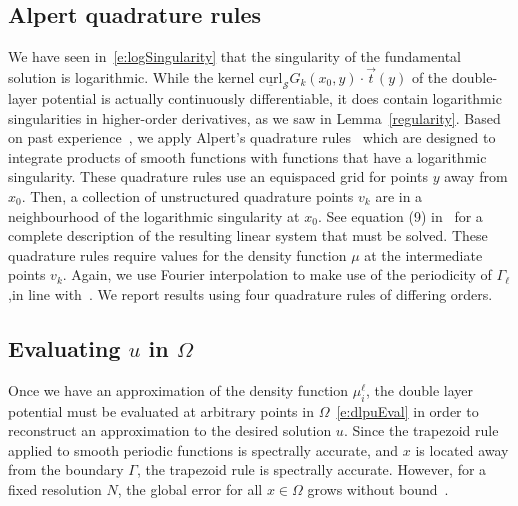 \documentclass[final]{siamltex}
\renewcommand{\S} {\mathcal{S}}
\begin{document}
\subsection{Alpert quadrature rules}
We have seen in~\eqref{e:logSingularity} that the singularity of the
fundamental solution is logarithmic.  While the kernel
$\underline{\mbox{curl}}_{\S}G_{k}(x_{0},y) \cdot \vec{t}(y)$ of the
double-layer potential is actually continuously differentiable, it does
contain logarithmic singularities in higher-order derivatives, as we
saw in Lemma~\ref{regularity}.  Based on past
experience~\cite{kro:qua2011,qua2011}, we apply Alpert's quadrature
rules~\cite{alpert} which are designed to integrate products of smooth
functions with functions that have a logarithmic singularity.  These
quadrature rules use an equispaced grid for points $y$ away from
$x_0$.  Then, a collection of unstructured quadrature points $v_{k}$
are in a neighbourhood of the logarithmic singularity at $x_0$.  See
equation (9) in~\cite{kro:qua2011} for a complete description of the
resulting linear system that must be solved.  These quadrature rules
require values for the density function $\mu$ at the intermediate
points $v_{k}$.  Again, we use Fourier interpolation  to make use of
the periodicity of $\Gamma_{\ell}$,in line with~\cite{kro:qua2011}.  We
report results using four quadrature rules of differing orders.


\subsection{Evaluating $u$ in $\Omega$}

Once we have an approximation of the density function $\mu_{i}^{\ell}$,
the double layer potential must be evaluated at arbitrary points in
$\Omega$~\eqref{e:dlpuEval} in order to reconstruct an approximation to the desired solution $u$.  Since the trapezoid rule applied to smooth
periodic functions is spectrally accurate, and $x$ is located away from
the boundary $\Gamma$, the trapezoid rule is spectrally accurate.
However, for a fixed resolution $N$, the global error for all $x \in
\Omega$ grows without bound~\cite{bir:yin:zor2006}.
\end{document}
